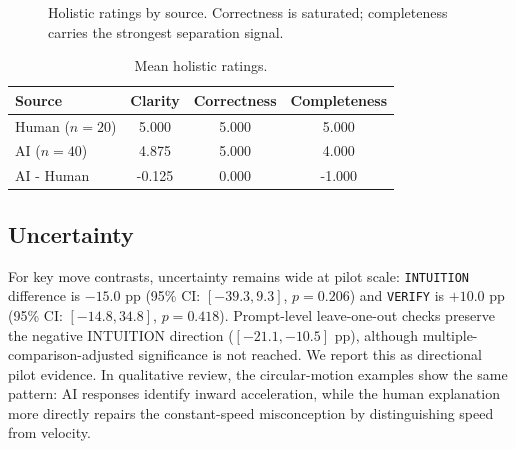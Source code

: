 \documentclass{article}
\begin{document}
\begin{figure}[t]
\centering
{}
\caption{Holistic ratings by source. Correctness is saturated; completeness carries the strongest separation signal.}
\label{fig:ratings}
\vspace{-0.9em}
\end{figure}

\begin{table}[t]
\centering
\small
\begin{tabular}{lccc}
\toprule
Source & Clarity & Correctness & Completeness \\
\midrule
Human ($n=20$) & 5.000 & 5.000 & 5.000 \\
AI ($n=40$) & 4.875 & 5.000 & 4.000 \\
AI - Human & -0.125 & 0.000 & -1.000 \\
\bottomrule
\end{tabular}
\caption{Mean holistic ratings.}
\label{tab:ratings}
\vspace{-0.8em}
\end{table}

\subsection{Uncertainty}
For key move contrasts, uncertainty remains wide at pilot scale: \texttt{INTUITION} difference is $-15.0$ pp (95\% CI: $[-39.3, 9.3]$, $p=0.206$) and \texttt{VERIFY} is $+10.0$ pp (95\% CI: $[-14.8, 34.8]$, $p=0.418$).
Prompt-level leave-one-out checks preserve the negative INTUITION direction ($[-21.1,-10.5]$ pp), although multiple-comparison-adjusted significance is not reached. We report this as directional pilot evidence. In qualitative review, the circular-motion examples show the same pattern: AI responses identify inward acceleration, while the human explanation more directly repairs the constant-speed misconception by distinguishing speed from velocity.
\end{document}
